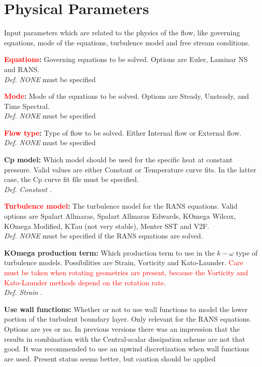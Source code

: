 \documentclass[12pt,epsf,colordvi]{article}
\begin{document}
\section{Physical Parameters}  \label{sec:phys}
%
Input parameters which are related to the physics of the flow, like governing equations, 
mode of the equations, turbulence  model and free stream conditions.
%
\begin{description}
%
   \item{ \bf  \textcolor{red}{ Equations}:} Governing equations to be solved. Options are Euler, Laminar NS and RANS. \\
   {\it Def. NONE } must be specified
%
    \item{ \bf \textcolor{red}{ Mode}:} Mode of the equations to be solved. Options are Steady, Unsteady, and Time Spectral. \\
   {\it Def. NONE } must be specified
%
     \item{ \bf \textcolor{red}{Flow type}:} Type of flow to be solved. Either Internal flow or External flow. \\
   {\it Def. NONE } must be specified
%
    \item{ \bf Cp model:} Which model should be used for the specific heat at constant pressure. Valid values are either Constant or Temperature curve fits. In the latter case, the Cp curve fit file must be specified. \\
   {\it Def. Constant }.
%
    \item{ \bf \textcolor{red}{ Turbulence model}:} The turbulence model for the RANS equations. Valid options are Spalart Allmaras, Spalart Allmaras Edwards, KOmega Wilcox, KOmega Modified, KTau (not very stable), Menter SST and V2F. \\
   {\it Def. NONE } must be specified if the RANS equations are solved.
%
    \item{ \bf KOmega production term:} Which production term to use in the \(k-\omega\) type of turbulence models. Possibilities are Strain, Vorticity and Kato-Launder.  
\textcolor{red}{ Care must be taken when rotating geometries are present, because the Vorticity and Kato-Launder methods depend on the rotation rate}.\\
   {\it Def. Strain }.
%
     \item{ \bf Use wall functions:} Whether or not to use wall functions to model the lower portion of the turbulent boundary layer. Only relevant for the RANS equations. Options are yes or no. In previous versions there was an impression that the results in combination with the Central-scalar dissipation scheme are not that good. It was recommended to use an upwind discretization when wall functions are used. Present status seems better, but caution should be applied \\

\end{description}
\end{document}
